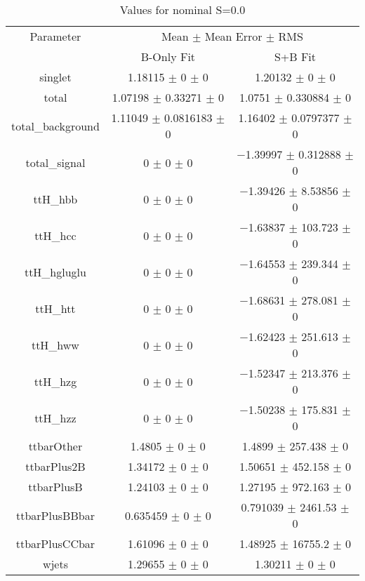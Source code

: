 \begin{table}
\centering
\caption{Values for nominal S=0.0}
\begin{tabular}{ccc}
\toprule
Parameter & \multicolumn{2}{c}{Mean $\pm$ Mean Error $\pm$ RMS}\\
 & B-Only Fit & S+B Fit\\
\midrule
singlet & \num{1.18115} $\pm$ \num{0} $\pm$ \num{0} & \num{1.20132} $\pm$ \num{0} $\pm$ \num{0}\\
total & \num{1.07198} $\pm$ \num{0.33271} $\pm$ \num{0} & \num{1.0751} $\pm$ \num{0.330884} $\pm$ \num{0}\\
total\_background & \num{1.11049} $\pm$ \num{0.0816183} $\pm$ \num{0} & \num{1.16402} $\pm$ \num{0.0797377} $\pm$ \num{0}\\
total\_signal & \num{0} $\pm$ \num{0} $\pm$ \num{0} & \num{-1.39997} $\pm$ \num{0.312888} $\pm$ \num{0}\\
ttH\_hbb & \num{0} $\pm$ \num{0} $\pm$ \num{0} & \num{-1.39426} $\pm$ \num{8.53856} $\pm$ \num{0}\\
ttH\_hcc & \num{0} $\pm$ \num{0} $\pm$ \num{0} & \num{-1.63837} $\pm$ \num{103.723} $\pm$ \num{0}\\
ttH\_hgluglu & \num{0} $\pm$ \num{0} $\pm$ \num{0} & \num{-1.64553} $\pm$ \num{239.344} $\pm$ \num{0}\\
ttH\_htt & \num{0} $\pm$ \num{0} $\pm$ \num{0} & \num{-1.68631} $\pm$ \num{278.081} $\pm$ \num{0}\\
ttH\_hww & \num{0} $\pm$ \num{0} $\pm$ \num{0} & \num{-1.62423} $\pm$ \num{251.613} $\pm$ \num{0}\\
ttH\_hzg & \num{0} $\pm$ \num{0} $\pm$ \num{0} & \num{-1.52347} $\pm$ \num{213.376} $\pm$ \num{0}\\
ttH\_hzz & \num{0} $\pm$ \num{0} $\pm$ \num{0} & \num{-1.50238} $\pm$ \num{175.831} $\pm$ \num{0}\\
ttbarOther & \num{1.4805} $\pm$ \num{0} $\pm$ \num{0} & \num{1.4899} $\pm$ \num{257.438} $\pm$ \num{0}\\
ttbarPlus2B & \num{1.34172} $\pm$ \num{0} $\pm$ \num{0} & \num{1.50651} $\pm$ \num{452.158} $\pm$ \num{0}\\
ttbarPlusB & \num{1.24103} $\pm$ \num{0} $\pm$ \num{0} & \num{1.27195} $\pm$ \num{972.163} $\pm$ \num{0}\\
ttbarPlusBBbar & \num{0.635459} $\pm$ \num{0} $\pm$ \num{0} & \num{0.791039} $\pm$ \num{2461.53} $\pm$ \num{0}\\
ttbarPlusCCbar & \num{1.61096} $\pm$ \num{0} $\pm$ \num{0} & \num{1.48925} $\pm$ \num{16755.2} $\pm$ \num{0}\\
wjets & \num{1.29655} $\pm$ \num{0} $\pm$ \num{0} & \num{1.30211} $\pm$ \num{0} $\pm$ \num{0}\\
\bottomrule
\end{tabular}
\end{table}